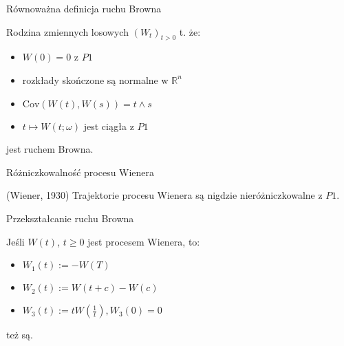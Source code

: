 \documentclass[avery5371,grid,frame]{flashcards}
\begin{document}
\begin{flashcard}[Twierdzenie]{Równoważna definicja ruchu Browna}

\smallskip
Rodzina zmiennych losowych $ \left( W_t \right) _{t > 0} $ t. że:
\begin{itemize}
\item $W(0) = 0$ z $P1$
\item rozkłady skończone są normalne w $\mathbb{R}^n$
\item $\text{Cov}(W(t), W(s)) = t \wedge s$
\item $t \mapsto W(t; \omega)$ jest ciągła z $P1$
\end{itemize}
jest ruchem Browna.
\end{flashcard}

\begin{flashcard}[Twierdzenie]{Różniczkowalność procesu Wienera}

\smallskip
(Wiener, 1930) Trajektorie procesu Wienera są nigdzie nieróżniczkowalne z $P1$.
\end{flashcard}

\begin{flashcard}[Twierdzenie]{Przekształcanie ruchu Browna}

\smallskip
Jeśli $W(t)$, $t \geq 0$ jest procesem Wienera, to:
\begin{itemize}
\item $W_1(t) := -W(T)$
\item $W_2(t) := W(t+c) - W(c)$
\item $W_3(t) := tW(\frac{1}{t}), W_3(0)=0$ 
\end{itemize}
też są.	
\end{flashcard}

\begin{flashcard}[]{}
\end{flashcard}
\end{document}
